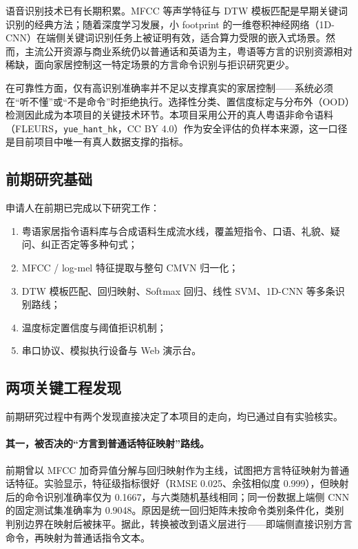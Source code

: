 \documentclass[UTF8,a4paper,12pt,fontset=fandol]{ctexart}
\begin{document}
语音识别技术已有长期积累。MFCC 等声学特征与 DTW 模板匹配是早期关键词识别的经典方法；随着深度学习发展，小 footprint 的一维卷积神经网络（1D-CNN）在端侧关键词识别任务上被证明有效，适合算力受限的嵌入式场景。然而，主流公开资源与商业系统仍以普通话和英语为主，粤语等方言的识别资源相对稀缺，面向家居控制这一特定场景的方言命令识别与拒识研究更少。

在可靠性方面，仅有高识别准确率并不足以支撑真实的家居控制——系统必须在“听不懂”或“不是命令”时拒绝执行。选择性分类、置信度标定与分布外（OOD）检测因此成为本项目的关键技术环节。本项目采用公开的真人粤语非命令语料（FLEURS，\texttt{yue\_hant\_hk}，CC BY 4.0）作为安全评估的负样本来源，这一口径是目前项目中唯一有真人数据支撑的指标。

\subsection{前期研究基础}

申请人在前期已完成以下研究工作：

\begin{enumerate}[leftmargin=2em]
  \item 粤语家居指令语料库与合成语料生成流水线，覆盖短指令、口语、礼貌、疑问、纠正否定等多种句式；
  \item MFCC / log-mel 特征提取与整句 CMVN 归一化；
  \item DTW 模板匹配、回归映射、Softmax 回归、线性 SVM、1D-CNN 等多条识别路线；
  \item 温度标定置信度与阈值拒识机制；
  \item 串口协议、模拟执行设备与 Web 演示台。
\end{enumerate}

\subsection{两项关键工程发现}

前期研究过程中有两个发现直接决定了本项目的走向，均已通过自有实验核实。

\paragraph{其一，被否决的“方言到普通话特征映射”路线。}
前期曾以 MFCC 加奇异值分解与回归映射作为主线，试图把方言特征映射为普通话特征。实验显示，特征级指标很好（RMSE 0.025、余弦相似度 0.999），但映射后的命令识别准确率仅为 0.1667，与六类随机基线相同；同一份数据上端侧 CNN 的固定测试集准确率为 0.9048。原因是统一回归矩阵未按命令类别条件化，类别判别边界在映射后被抹平。据此，转换被改到语义层进行——即端侧直接识别方言命令，再映射为普通话指令文本。
\end{document}
